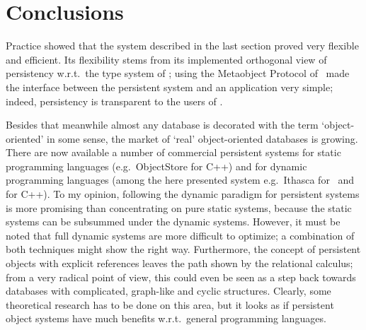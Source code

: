\documentclass[a4paper%
]{article}
\begin{document}
\section{Conclusions}
%
Practice showed that the system described in the last section proved
very flexible and efficient. Its flexibility stems from its
implemented orthogonal view of persistency w.r.t.\ the type system of
\clos; using the Metaobject Protocol of \clos\ made
the interface between the persistent system and an application very
simple; indeed, persistency is transparent to the users of \plob. 
%
\par{}Besides that meanwhile almost any database is decorated with the
term `object-oriented' in some sense, the market of `real'
object-oriented databases is growing. There are now available a number
of commercial persistent systems for static programming languages
(e.g.\ ObjectStore for C++) and for dynamic programming languages
(among the here presented system e.g.\ Ithasca for \clos\ and for
C++). To my opinion, following the dynamic paradigm for persistent
systems is more promising than concentrating on pure static
systems, because the static systems can be subsummed under the dynamic
systems. However, it must be noted that full dynamic systems are more
difficult to optimize; a combination of both techniques might show the
right way. Furthermore, the concept of persistent objects with
explicit references leaves the path shown by the relational calculus;
from a very radical point of view, this could even be seen as a step
back towards databases with complicated, graph-like and cyclic
structures. Clearly, some theoretical research has to be done on this
area, but it looks as if persistent object systems have much benefits
w.r.t.\ general programming languages.
%
\end{document}
